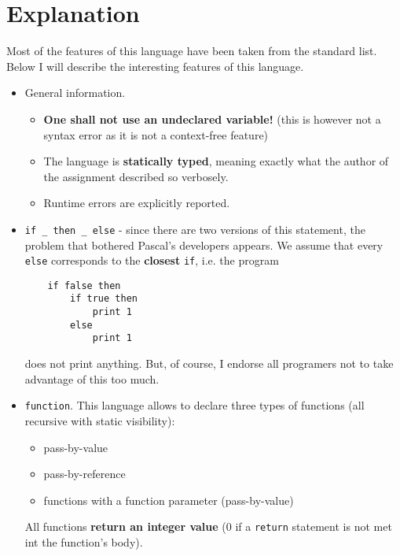 \documentclass[11pt]{article}
\begin{document}
\section{Explanation}
Most of the features of this language have been taken from the standard list. Below I will describe the interesting features of this language.
\begin{itemize}
	\item General information.
	\begin{itemize}
		\item \textbf{One shall not use an undeclared variable!} (this is however not a syntax error as it is not a context-free feature)
		\item The language is \textbf{statically typed}, meaning exactly what the author of the assignment described so verbosely.
		\item Runtime errors are explicitly reported.
	\end{itemize}
	\item \texttt{if \_ then \_ else} - since there are two versions of this statement, the problem that bothered Pascal's developers appears. We assume that every \texttt{else} corresponds to the \textbf{closest} \texttt{if}, i.e. the program
	\begin{lstlisting}
	if false then
		if true then
			print 1
		else
			print 1
	\end{lstlisting}
does not print anything. But, of course, I endorse all programers not to take advantage of this too much.
	\item \texttt{function}. This language allows to declare three types of functions (all recursive with static visibility):
	\begin{itemize}
		\item pass-by-value
		\item pass-by-reference
		\item functions with a function parameter (pass-by-value)
	\end{itemize}
	All functions \textbf{return an integer value} (0 if a \texttt{return} statement is not met int the function's body).
	

\end{itemize}
\end{document}
